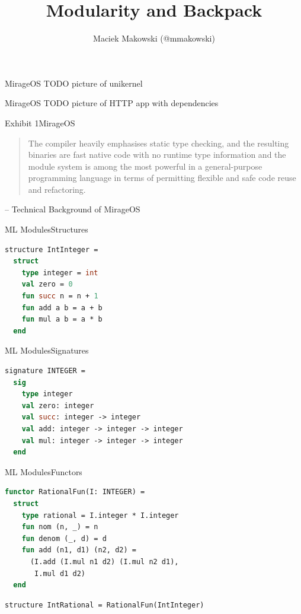 \documentclass{beamer}
\begin{document}
\title{Modularity and Backpack}
\author{Maciek Makowski (@mmakowski)}

\frame{\titlepage}

\begin{frame}{MirageOS}
TODO picture of unikernel
\end{frame}

\begin{frame}{MirageOS}
TODO picture of HTTP app with dependencies
\end{frame}

\begin{frame}{Exhibit 1}{MirageOS}
\begin{quote}
The compiler heavily emphasises static type checking, and the resulting binaries are fast native code with no runtime type information and the module system is among the most powerful in a general-purpose programming language in terms of permitting flexible and safe code reuse and refactoring.
\end{quote}
-- Technical Background of MirageOS
\end{frame}

\begin{frame}[fragile]{ML Modules}{Structures}
\begin{lstlisting}[language=ML]
structure IntInteger =
  struct
    type integer = int
    val zero = 0
    fun succ n = n + 1
    fun add a b = a + b
    fun mul a b = a * b
  end
\end{lstlisting}
\end{frame}

\begin{frame}[fragile]{ML Modules}{Signatures}
\begin{lstlisting}[language=ML]
signature INTEGER =
  sig
    type integer
    val zero: integer
    val succ: integer -> integer
    val add: integer -> integer -> integer
    val mul: integer -> integer -> integer
  end
\end{lstlisting}
\end{frame}

\begin{frame}[fragile]{ML Modules}{Functors}
\begin{lstlisting}[language=ML]
functor RationalFun(I: INTEGER) =
  struct
    type rational = I.integer * I.integer
    fun nom (n, _) = n
    fun denom (_, d) = d
    fun add (n1, d1) (n2, d2) =
      (I.add (I.mul n1 d2) (I.mul n2 d1),
       I.mul d1 d2)
  end
\end{lstlisting}
\begin{lstlisting}[language=ML]
structure IntRational = RationalFun(IntInteger)
\end{lstlisting}
\end{frame}
\end{document}
